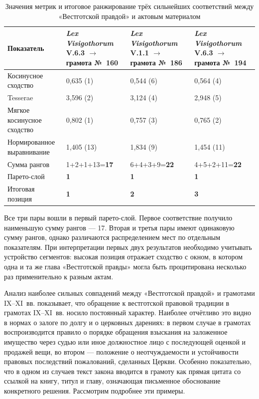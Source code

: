 \begin{center}
\small
\setlength{\tabcolsep}{2pt}
\begin{longtable}{|p{}|p{}|p{}|p{}|}
\caption{Значения метрик и итоговое ранжирование трёх сильнейших соответствий между «Вестготской правдой» и актовым материалом}\label{tab:ch1-charters-ranking}\\
\hline
\textbf{Показатель} & \textbf{\emph{Lex Visigothorum} V.6.3 $\rightarrow$ грамота №~160} & \textbf{\emph{Lex Visigothorum} V.1.1 $\rightarrow$ грамота №~186} & \textbf{\emph{Lex Visigothorum} V.6.3 $\rightarrow$ грамота №~194} \\ \hline
Косинусное сходство & 0,635 (1) & 0,544 (6) & 0,564 (4) \\ \hline
Tesserae & 3,596 (2) & 3,124 (4) & 2,948 (5) \\ \hline
Мягкое косинусное сходство & 0,802 (1) & 0,757 (3) & 0,765 (2) \\ \hline
Нормированное выравнивание & 1,405 (13) & 1,834 (9) & 1,454 (11) \\ \hline
Сумма рангов & 1+2+1+13=\textbf{17} & 6+4+3+9=\textbf{22} & 4+5+2+11=\textbf{22} \\ \hline
Парето-слой & \textbf{1} & \textbf{1} & \textbf{1} \\ \hline
Итоговая позиция & \textbf{1} & \textbf{2} & \textbf{3} \\ \hline
\end{longtable}
\end{center}

Все три пары вошли в первый парето-слой. Первое соответствие получило наименьшую сумму рангов --- 17. Вторая и третья пары имеют одинаковую сумму рангов, однако различаются распределением мест по отдельным показателям. При интерпретации первых двух результатов необходимо учитывать устройство сегментов: высокая позиция отражает сходство с окном, в котором одна и та же глава «Вестготской правды» могла быть процитирована несколько раз применительно к разным актам.

Анализ наиболее сильных совпадений между «Вестготской правдой» и грамотами IX--XI~вв. показывает, что обращение к вестготской правовой традиции в грамотах IX--XI~вв. носило постоянный характер. Наиболее отчётливо это видно в нормах о залоге по долгу и о церковных дарениях: в первом случае в грамотах воспроизводится правило о порядке обращения взыскания на заложенное имущество через судью или иное должностное лицо с последующей оценкой и продажей вещи, во втором --- положение о неотчуждаемости и устойчивости правовых последствий пожалований, сделанных Церкви. Особенно показательно, что в одном из случаев текст закона вводится в грамоту как прямая цитата со ссылкой на книгу, титул и главу, означающая письменное обоснование конкретного решения. Рассмотрим подробнее эти примеры.

